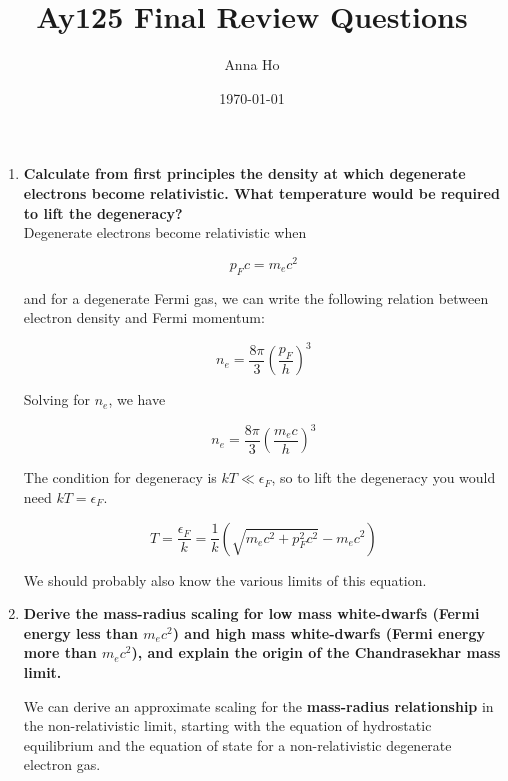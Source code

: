 \documentclass[a4paper]{article}
\title{Ay125 Final Review Questions}
\author{Anna Ho}
\date{\today}
\begin{document}
\maketitle

\begin{enumerate}

\item \textbf{Calculate from first principles the density at which degenerate electrons become relativistic. What temperature would be required to lift the degeneracy?} \\

Degenerate electrons become relativistic when 

\begin{equation}
p_F c = m_e c^2
\end{equation}

and for a degenerate Fermi gas, we can write the following relation between electron density and Fermi momentum:

\begin{equation}
n_e = \frac{8 \pi}{3} \left( \frac{p_F}{h} \right)^3
\end{equation}

Solving for $n_e$, we have

\begin{equation}
n_e = \frac{8 \pi}{3} \left( \frac{m_e c}{h} \right)^3
\end{equation}

The condition for degeneracy is $kT \ll \epsilon_F$, so to lift the degeneracy you would need $kT = \epsilon_F$. 

\begin{equation}
T = \frac{\epsilon_F}{k} = \frac{1}{k} \left( \sqrt{m_e c^2 + p_F^2 c^2} - m_e c^2 \right)
\end{equation}

We should probably also know the various limits of this equation. \newline

\item \textbf{Derive the mass-radius scaling for low mass white-dwarfs (Fermi energy less than $m_e c^2$) and high mass white-dwarfs (Fermi energy more than $m_e c^2$), and explain the origin of the Chandrasekhar mass limit.} \newline

We can derive an approximate scaling for the \textbf{mass-radius relationship} in the non-relativistic limit, starting with the equation of hydrostatic equilibrium and the equation of state for a non-relativistic degenerate electron gas.


\end{enumerate}
\end{document}
